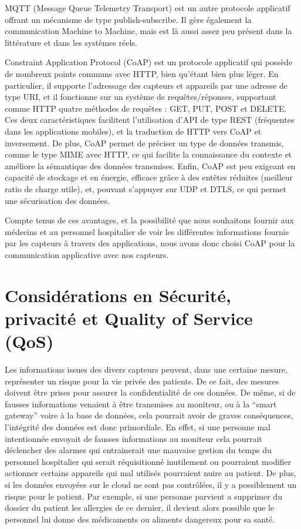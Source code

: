 \documentclass{article}
\begin{document}
MQTT (Message Queue Telemetry Transport) \cite{MQTT} est un autre protocole applicatif offrant un mécanisme de type publish-subscribe. Il gère également la communication Machine to Machine, mais est là aussi assez peu présent dans la littérature et dans les systèmes réels.

Constraint Application Protocol (CoAP) \cite{CoAP} est un protocole applicatif qui possède de nombreux points communs avec HTTP, bien qu’étant bien plus léger. En particulier, il supporte l’adressage des capteurs et appareils par une adresse de type URI, et il fonctionne sur un système de requêtes/réponses, supportant comme HTTP quatre méthodes de requêtes : GET, PUT, POST et DELETE. Ces deux caractéristiques facilitent l’utilisation d’API de type REST (fréquentes dans les applications mobiles), et la traduction de HTTP vers CoAP et inversement. De plus, CoAP permet de préciser un type de données transmis, comme le type MIME avec HTTP, ce qui facilite la connaissance du contexte et améliore la sémantique des données transmises. Enfin, CoAP est peu exigeant en capacité de stockage et en énergie, efficace grâce à des entêtes réduites (meilleur ratio de charge utile), et, pouvant s’appuyer sur UDP et DTLS, ce qui permet une sécurisation des données.

Compte tenus de ces avantages, et la possibilité que nous souhaitons fournir aux médecins et au personnel hospitalier de voir les différentes informations fournis par les capteurs à travers des applications, nous avons donc choisi CoAP pour la communication applicative avec nos capteurs.

\section {Considérations en Sécurité, privacité et Quality of Service (QoS)}

Les informations issues des divers capteurs peuvent, dans une certaine mesure, représenter un risque pour la vie privée des patients. De ce fait, des mesures doivent être prises pour assurer la confidentialité de ces données. De même, si de fausses informations venaient à être transmises au moniteur, ou à la “smart gateway” voire à la base de données, cela pourrait avoir de graves conséquences, l'intégrité des données est donc primordiale. En effet, si une personne mal intentionnée envoyait de fausses informations au moniteur cela pourrait déclencher des alarmes qui entrainerait une mauvaise gestion du temps du personnel hospitalier qui serait réquisitionné inutilement ou pourraient modifier actionner certains appareils qui mal utilisés pourraient nuire au patient. De plus, si les données envoyées sur le cloud ne sont pas contrôlées, il y a possiblement un risque pour le patient. Par exemple, si une personne parvient a supprimer du dossier du patient les allergies de ce dernier, il devient alors possible que le personnel lui donne des médicaments ou aliments dangereux pour sa santé.
\end{document}
